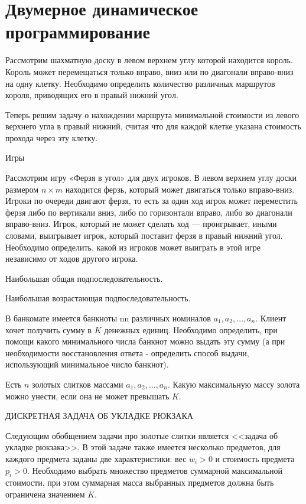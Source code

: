\documentclass[14pt]{book}
\begin{document}
\section{Двумерное динамическое программирование}

Рассмотрим шахматную доску в левом верхнем углу которой находится король. Король может перемещаться только вправо, вниз или по диагонали вправо-вниз на одну клетку. Необходимо определить количество различных маршрутов короля, приводящих его в правый нижний угол.

Теперь решим задачу о нахождении маршрута минимальной стоимости из левого верхнего угла в правый нижний, считая что для каждой клетке указана стоимость прохода через эту клетку.

Игры

Рассмотрим игру «Ферзя в угол» для двух игроков. В левом верхнем углу доски размером $n \times m$ 
находится ферзь, который может двигаться только вправо-вниз. Игроки по очереди двигают ферзя, то есть 
за один ход игрок может переместить ферзя либо по вертикали вниз, либо по горизонтали вправо, либо во 
диагонали вправо-вниз. Игрок, который не может сделать ход — проигрывает, иными словами, выигрывает 
игрок, который поставит ферзя в правый нижний угол. Необходимо определить, какой из игроков может 
выиграть в этой игре независимо от ходов другого игрока.

Наибольшая общая подпоследовательность.

Наибольшая возрастающая подпоследовательность.

В банкомате имеется банкноты nn различных номиналов $a_1, a_2, \ldots, a_n$. Клиент хочет получить сумму в $K$ денежных единиц. Необходимо определить, при помощи какого минимального числа банкнот можно выдать эту сумму (а при необходимости восстановления ответа - определить способ выдачи, использующий минимальное число банкнот).

Есть $n$ золотых слитков массами $a_1, a_2, \ldots, a_n$. Какую максимальную массу золота можно унести, если она не может превышать $K$.

ДИСКРЕТНАЯ ЗАДАЧА ОБ УКЛАДКЕ РЮКЗАКА

Следующим обобщением задачи про золотые слитки является <<задача об укладке рюкзака>>. В этой задаче также имеется несколько предметов, для каждого предмета заданы две характеристики: вес $w_i > 0$ и стоимость предмета $p_i > 0$. Необходимо выбрать множество предметов суммарной максимальной стоимости, при этом суммарная масса выбранных предметов должна быть ограничена значением $K$.
\end{document}
